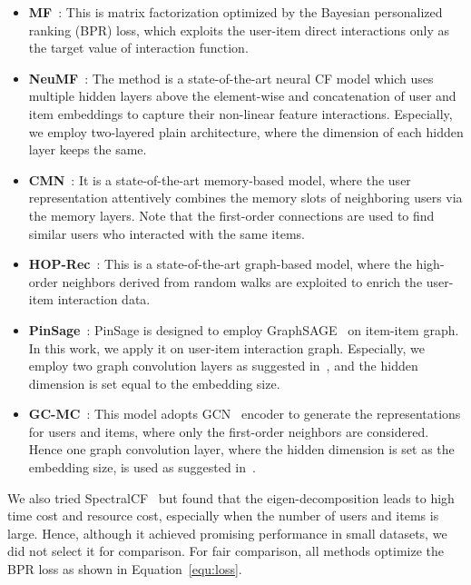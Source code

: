 \documentclass[sigconf]{acmart}
\theoremstyle{definition}
\begin{document}
\begin{itemize}[leftmargin=*]
\item \textbf{MF}~\cite{BPRMF}: This is matrix factorization optimized by the Bayesian personalized ranking (BPR) loss, which exploits the user-item direct interactions only as the target value of interaction function.

\item \textbf{NeuMF}~\cite{NCF}: The method is a state-of-the-art neural CF model which uses multiple hidden layers above the element-wise and concatenation of user and item embeddings to capture their non-linear feature interactions.
Especially, we employ two-layered plain architecture, where the dimension of each hidden layer keeps the same.




\item \textbf{CMN}~\cite{CMN}: It is a state-of-the-art memory-based model, where the user representation attentively combines the memory slots of neighboring users via the memory layers.
Note that the first-order connections are used to find similar users who interacted with the same items.


\item \textbf{HOP-Rec}~\cite{HOP-rec}: This is a state-of-the-art graph-based model, where the high-order neighbors derived from random walks are exploited to enrich the user-item interaction data.


\item \textbf{PinSage}~\cite{PinSage}: PinSage is designed to employ GraphSAGE~\cite{GraphSAGE} on item-item graph. In this work, we apply it on user-item interaction graph. Especially, we employ two graph convolution layers as suggested in~\cite{PinSage}, and the hidden dimension is set equal to the embedding size.

\item \textbf{GC-MC}~\cite{GC-MC}: This model adopts GCN~\cite{GCN} encoder to generate the representations for users and items, where only the first-order neighbors are considered. Hence one graph convolution layer, where the hidden dimension is set as the embedding size, is used as suggested in~\cite{GC-MC}.
\end{itemize}
We also tried SpectralCF~\cite{SpectralCF} but found that the eigen-decomposition leads to high time cost and resource cost, especially when the number of users and items is large.
Hence, although it achieved promising performance in small datasets, we did not select it for comparison.
For fair comparison, all methods optimize the BPR loss as shown in Equation~\eqref{equ:loss}.
\end{document}
